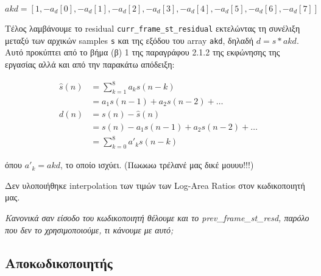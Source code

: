\documentclass{article}
\begin{document}
\begin{equation}
    akd = \left[1, -a_d[0], -a_d[1], -a_d[2], -a_d[3], -a_d[4], -a_d[5], -a_d[6], -a_d[7]\right]
\end{equation}

Τέλος λαμβάνουμε το residual \verb|curr_frame_st_residual| εκτελώντας τη συνέλιξη 
μεταξύ των αρχικών samples \verb|s| και της εξόδου του array \verb|akd|, 
δηλαδή $d = s \ast akd$. Αυτό προκύπτει από το βήμα (β) 1 της παραγράφου 
2.1.2 της εκφώνησης της εργασίας αλλά και από την παρακάτω απόδειξη:

\begin{align}
    \hat{s}(n) &= \sum_{k=1}^8 a_ks(n-k) \\
                   &= a_1 s(n - 1) + a_2 s(n - 2) + \ldots \\
              d(n) &= s(n) - \hat{s}(n) \\
                   &= s(n) - a_1 s(n - 1) + a_2 s(n - 2)+ \ldots \\
                   &= \sum_{k=0}^8 a'_ks(n-k)
\end{align}

όπου $a'_k = akd$, το οποίο ισχύει. (Πωωωω τρέλανέ μας δικέ μουυυ!!!)

Δεν υλοποιήθηκε interpolation των τιμών των Log-Area Ratios στον κωδικοποιητή μας.

\emph{Κανονικά σαν είσοδο του κωδικοποιητή θέλουμε και το prev\_frame\_st\_resd, 
παρόλο που δεν το χρησιμοποιούμε, τι κάνουμε με αυτό;}
\subsection{Αποκωδικοποιητής}
\end{document}
